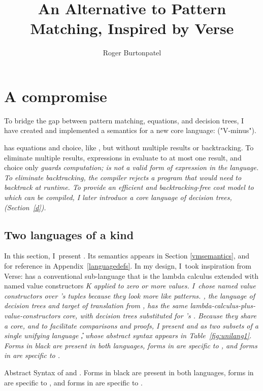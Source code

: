 \documentclass[manuscript,screen,review, 12pt, nonacm]{acmart}
\title{An Alternative to Pattern Matching, Inspired by Verse}
\author{Roger Burtonpatel}
\affiliation{%
\institution{Tufts University}
\streetaddress{419 Boston Ave}
  \city{Medford}
  \state{Massachusetts}
  \country{USA}
  \postcode{02155}
  }
\begin{document}
  
\section{A compromise}
\label{compromise}
    
    To bridge the gap between pattern matching, equations, and decision trees, I
    have created and implemented a semantics for a new core language: \VMinus
    ("V-minus"). 
    
    \VMinus has equations and choice, like \VC, but without multiple results or
    backtracking. To eliminate multiple results, expressions in \VMinus evaluate
    to at most one result, and choice only \it{guards} computation; is not a
    valid form of expression in the language. To eliminate backtracking, the
    compiler rejects a \VMinus program that would need to backtrack at runtime.
    To provide an efficient and backtracking-free cost model to which \VMinus
    can be compiled, I later introduce a core language of decision trees, \D
    (Section~\ref{d}). 

    \subsection{Two languages of a kind}
    
    In this section, I~present \VMinus. Its semantics appears in Section
    \ref{vmsemantics}, and for reference in Appendix~\ref{languagedefs}. In my
    design, I~took inspiration from Verse: \VMinus has a conventional
    sub-language that is the lambda calculus extended with named value
    constructors \it{K} applied to zero or more values. I~chose named value
    constructors over \VC's tuples because they look more like patterns. \D, the
    language of decision trees and target of translation from \VMinus, has the
    same lambda-calculus-plus-value-constructors core, with decision trees
    substituted for \VMinus's \iffibf. Because they share a core, and to
    facilitate comparisons and proofs, I present \VMinus and \D as two subsets
    of a single unifying language \U, whose abstract syntax appears in
    Table~\ref{fig:unilang1}. Forms in black are present in both languages,
    forms in  are specific to \VMinus, and forms in  are
    specific to \D. 

    \begin{table}[ht]
      \utable
      \caption{Abstract Syntax of \VMinus and \D. Forms in black are present in
              both languages, forms in  are specific to \VMinus, and
              forms in  are specific to \D.}
      \label{fig:unilang1}
    \end{table}
\end{document}

